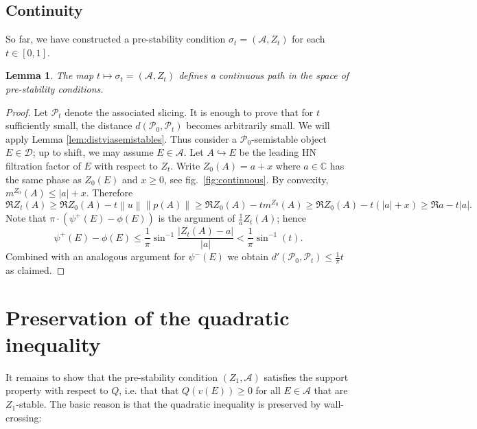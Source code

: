 \documentclass[leqno,11pt,twoside]{amsart}
\newtheorem{Lem}[Thm]{Lemma}
\theoremstyle{definition}
\begin{document}
\subsection*{Continuity} So far, we have constructed a pre-stability condition
$\sigma_t = ({\ensuremath{\mathcal A}}, Z_t)$ for each $t \in [0, 1]$.
\begin{Lem} \label{lem:continuous}
The map $t \mapsto \sigma_t = ({\ensuremath{\mathcal A}}, Z_t)$ defines a continuous path in the space of
pre-stability conditions.
\end{Lem}
\begin{proof}
Let ${\ensuremath{\mathcal P}}_t$ denote the associated slicing. It is enough to prove that for $t$ sufficiently small,
the distance $d({\ensuremath{\mathcal P}}_0, {\ensuremath{\mathcal P}}_t)$ becomes arbitrarily small. We will apply Lemma
\ref{lem:distviasemistables}. Thus consider a ${\ensuremath{\mathcal P}}_0$-semistable object $E \in
{\ensuremath{\mathcal D}}$; up to shift, we may assume $E \in {\ensuremath{\mathcal A}}$. Let $A {\ensuremath{\hookrightarrow}} E$ be the leading HN filtration factor
of $E$ with respect to $Z_t$. Write $Z_0(A) = a + x$ where $a \in {\ensuremath{\mathbb{C}}}$ has the same phase as
$Z_0(E)$ and $x \ge 0$, see fig.~\ref{fig:continuous}.
By convexity, $m^{Z_0}(A) \le {\left\lvert{a}\right\rvert} + x$. Therefore
\[
\Re Z_t(A)
\ge \Re {Z_0}(A) - t {\left\|{u}\right\|} {\left\|{p(A)}\right\|}
\ge \Re {Z_0}(A) - t m^{Z_0}(A)
\ge \Re {Z_0}(A) - t \left({\left\lvert{a}\right\rvert} + x\right)
\ge \Re a - t {\left\lvert{a}\right\rvert}.
\]
Note that $\pi\cdot \left(\psi^+(E) - \phi(E)\right)$ is the argument of $\frac 1a Z_t(A)$; hence
\[ \psi^+(E) - \phi(E) \le \frac 1{\pi} \sin^{-1} \frac{{\left\lvert{Z_t(A) - a}\right\rvert}}{{\left\lvert{a}\right\rvert}} < \frac
1{\pi}\sin^{-1}(t).\]
Combined with an analogous argument for $\psi^-(E)$ we obtain $d'({\ensuremath{\mathcal P}}_0, {\ensuremath{\mathcal P}}_t) \le \frac 1{\pi}
t$ as claimed.
\end{proof}

\section{Preservation of the quadratic inequality}
\label{sect:Qpreserved}

It remains to show that the pre-stability condition $(Z_1, {\ensuremath{\mathcal A}})$ satisfies the support property
with respect to $Q$, i.e. that 
that $Q(v(E)) \ge 0$ for all $E \in {\ensuremath{\mathcal A}}$ that are $Z_1$-stable. The basic reason is that the quadratic inequality is preserved by wall-crossing:
\end{document}
